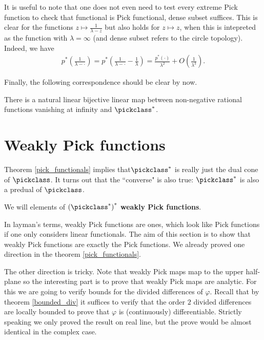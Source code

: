 It is useful to note that one does not even need to test every extreme Pick function to check that functional is Pick functional, dense subset suffices. This is clear for the functions $z \mapsto \frac{1}{\lambda - z}$ but also holds for $z \mapsto z$, when this is intepreted as the function with $\lambda = \infty$ (and dense subset refers to the circle topology). Indeed, we have
\begin{align*}
	p^{*}\left(\frac{1}{\lambda - \cdot}\right) = p^{*}\left(\frac{1}{\lambda - \cdot} - \frac{1}{\lambda}\right) = \frac{p^{*}(\cdot)}{\lambda^2} + O\left(\frac{1}{\lambda^3}\right).
\end{align*}

Finally, the following correspondence should be clear by now.

\begin{lem}
	There is a natural linear bijective linear map between non-negative rational functions vanishing at infinity and $\pickclass^{*}$.
\end{lem}

\section{Weakly Pick functions}

Theorem \ref{pick_functionals} implies that$\pickclass^{*}$ is really just the dual cone of $\pickclass$. It turns out that the ``converse" is also true: $\pickclass^{*}$ is also a predual of $\pickclass$.

\begin{maar}
	We will elements of $\left(\pickclass^{*}\right)^{*}$ \textbf{weakly Pick functions}.
\end{maar}

In layman's terms, weakly Pick functions are ones, which look like Pick functions if one only considers linear functionals. The aim of this section is to show that weakly Pick functions are exactly the Pick functions. We already proved one direction in the theorem \ref{pick_functionals}. 

The other direction is tricky. Note that weakly Pick maps map to the upper half-plane so the interesting part is to prove that weakly Pick maps are analytic. For this we are going to verify bounds for the divided differences of $\varphi$. Recall that by theorem \ref{bounded_div} it suffices to verify that the order $2$ divided differences are locally bounded to prove that $\varphi$ is (continuously) differentiable. Strictly speaking we only proved the result on real line, but the prove would be almost identical in the complex case.


